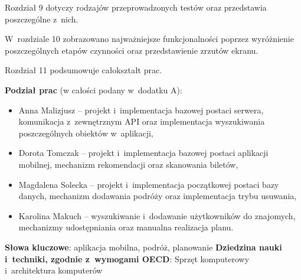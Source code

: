 \par Rozdział 9 dotyczy rodzajów przeprowadzonych testów oraz przedstawia poszczególne z~nich.

\par W~rozdziale 10 zobrazowano najważniejsze funkcjonalności poprzez wyróżnienie poszczególnych etapów czynności oraz przedstawienie zrzutów ekranu. 

\par Rozdział 11 podsumowuje całokształt prac.

\par \textbf{Podział prac} (w całości podany w~dodatku A):
\begin{itemize}
\item Anna Malizjusz --  projekt i~implementacja bazowej postaci serwera, komunikacja z~zewnętrznym API oraz implementacja wyszukiwania poszczególnych obiektów w~aplikacji,
\item Dorota Tomczak -- projekt i~implementacja bazowej postaci aplikacji mobilnej, mechanizm rekomendacji oraz skanowania biletów,
\item Magdalena Solecka -- projekt i~implementacja początkowej postaci bazy danych, mechanizm dodawania podróży oraz implementacja trybu usuwania,
\item Karolina Makuch -- wyszukiwanie i~dodawanie użytkowników do znajomych, mechanizmy udostępniania oraz manualna realizacja planu.
\end{itemize}
\textbf{Słowa kluczowe}: aplikacja mobilna, podróż, planowanie
\newline\textbf{Dziedzina nauki i~techniki, zgodnie z~wymogami OECD}: Sprzęt komputerowy i~architektura komputerów
